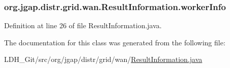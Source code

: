 \hypertarget{classorg_1_1jgap_1_1distr_1_1grid_1_1wan_1_1_result_information_a489addd9b351bb90aac229de8d3d3784}{
\subsubsection[{worker\-Info}]{ org.\-jgap.\-distr.\-grid.\-wan.\-Result\-Information.\-worker\-Info}}\label{classorg_1_1jgap_1_1distr_1_1grid_1_1wan_1_1_result_information_a489addd9b351bb90aac229de8d3d3784}


Definition at line 26 of file Result\-Information.\-java.



The documentation for this class was generated from the following file\-:\begin{DoxyCompactItemize}
\item 
L\-D\-H\-\_\-\-Git/src/org/jgap/distr/grid/wan/\hyperlink{_result_information_8java}{Result\-Information.\-java}\end{DoxyCompactItemize}
